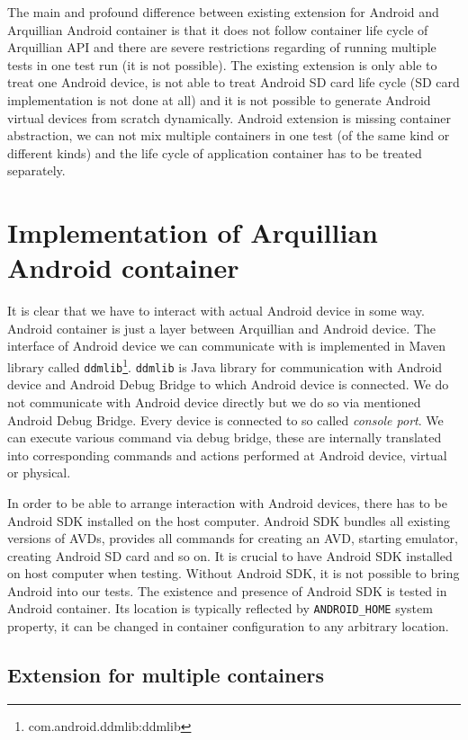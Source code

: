 \documentclass[12pt,final,oneside]{fithesis}
\begin{document}
The main and profound difference between existing extension for Android and Arquillian Android container is that it does not follow container life cycle of Arquillian API and there are severe restrictions regarding of running multiple tests in one test run (it is not possible). The existing extension is only able to treat one Android device, is not able to treat Android SD card life cycle (SD card implementation is not done at all) and it is not possible to generate Android virtual devices from scratch dynamically. Android extension is missing container abstraction, we can not mix multiple containers in one test (of the same kind or different kinds) and the life cycle of application container has to be treated separately.

\chapter{Implementation of Arquillian Android container}

It is clear that we have to interact with actual Android device in some way. Android container is just a layer between Arquillian and Android device. The interface of Android device we can communicate with is implemented in Maven library called \texttt{ddmlib}\footnote{com.android.ddmlib:ddmlib}. \texttt{ddmlib} is Java library for communication with Android device and Android Debug Bridge\cite{bib100} to which Android device is connected. We do not communicate with Android device directly but we do so via mentioned Android Debug Bridge. Every device is connected to so called \textit{console port}. We can execute various command via debug bridge, these are internally translated into corresponding commands and actions performed at Android device, virtual or physical.

In order to be able to arrange interaction with Android devices, there has to be Android SDK installed on the host computer. Android SDK bundles all existing versions of AVDs, provides all commands for creating an AVD, starting emulator, creating Android SD card and so on. It is crucial to have Android SDK installed on host computer when testing. Without Android SDK, it is not possible to bring Android into our tests. The existence and presence of Android SDK is tested in Android container. Its location is typically reflected by \texttt{ANDROID\_HOME} system property, it can be changed in container configuration to any arbitrary location.

	\section{Extension for multiple containers}
\end{document}
